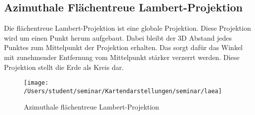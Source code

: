 \subsection{Azimuthale Flächentreue Lambert-Projektion}
\label{sec:lamflach}
Die flächentreue Lambert-Projektion ist eine globale Projektion. Diese Projektion wird um einen Punkt 
herum aufgebaut. Dabei bleibt der 3D Abstand jedes Punktes zum Mittelpunkt der Projektion erhalten.
Das sorgt dafür das Winkel mit zunehmender Entfernung vom Mittelpunkt stärker verzerrt werden. 
Diese Projektion stellt die Erde als Kreis dar.\\

\begin{figure}[hbtp]
\centering
\texttt{[image: /Users/student/seminar/Kartendarstellungen/seminar/laea]} \caption{Azimuthale flächentreue Lambert-Projektion}
\end{figure}
\newpage 